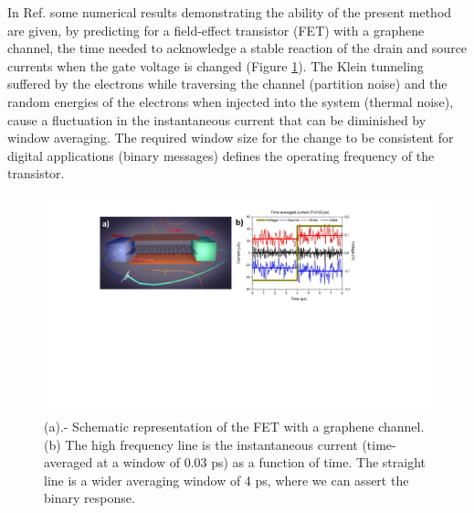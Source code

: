 \documentclass[11pt, a4paper]{article} %
\begin{document}
In Ref. \cite{Thz} some numerical results demonstrating the ability of the present method are given, by predicting for a field-effect transistor (FET) with a graphene channel, the time needed to acknowledge a stable reaction of the drain and source currents when the gate voltage is changed (Figure \ref{fig:fig}). The Klein tunneling suffered by the electrons while traversing the channel (partition noise) and the random energies of the electrons when injected into the system (thermal noise), cause a fluctuation in the instantaneous current that can be diminished by window averaging. The required window size for the change to be consistent for digital applications (binary messages) defines the operating frequency of the transistor.\vspace{-0.2cm}
\begin{figure}[h!]
  \centering
  \hspace*{-0.5cm}
   \includegraphics[width=1.05\linewidth]{Figures/figurefinal.pdf}\vspace{-0.3cm}
   \caption{(a).- Schematic representation of the FET with a graphene channel. (b) The high frequency line is the instantaneous current (time-averaged at a window of $0.03$ ps) as a function of time. The straight line is a wider averaging window of 4 ps, where we can assert the binary response.}\vspace{-0.5cm}
  \label{fig:fig}
\end{figure}
\end{document}
